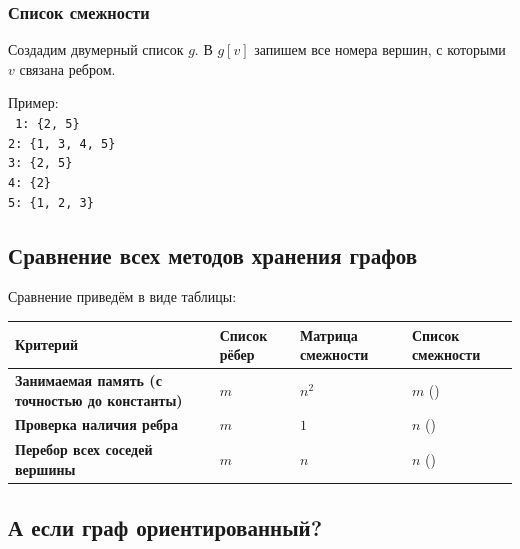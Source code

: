 \documentclass{article}
\begin{document}
	\subsubsection{Список смежности}
	
	Создадим двумерный список $g$. В $g[v]$ запишем все номера вершин, с которыми $v$ связана ребром.
	
	Пример:\\
	\texttt{
	1: \{2, 5\}\\
	2: \{1, 3, 4, 5\} \\
	3: \{2, 5\} \\
	4: \{2\} \\
	5: \{1, 2, 3\} \\
	}
	
	\subsection{Сравнение всех методов хранения графов}
	
	Сравнение приведём в виде таблицы:
	
	\begin{table}[H]
		\centering
		\begin{tabularx}{\textwidth}{|X|X|X|X|}
			\hline
			\textbf{Критерий} & \textbf{Список рёбер} & \textbf{Матрица смежности} & \textbf{Список смежности} \\
			\hline
			\textbf{Занимаемая память (с точностью до константы)} & $m$ & $n^2$ & $m$ (\footnotemark) \\
			\hline
			\textbf{Проверка наличия ребра} & $m$ & $1$ & $n$ (\footnotemark) \\
			\hline
			\textbf{Перебор всех соседей вершины} & $m$ & $n$ & $n$ (\footnotemark) \\
			\hline
		\end{tabularx}
	\end{table}
	
	
	\subsection{А если граф ориентированный?}
	
\end{document}

